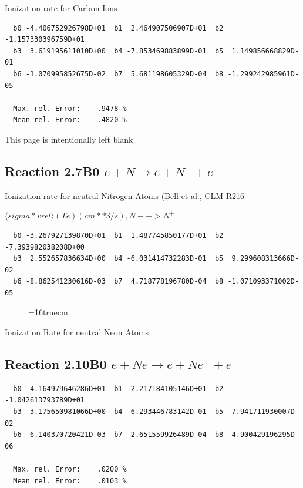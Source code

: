 \documentclass[12pt,dvips]{article}
\begin{document}
  Ionization rate for Carbon Ions


\begin{small}\begin{verbatim}
  b0 -4.406752926798D+01  b1  2.464907506907D+01  b2 -1.157330396759D+01
  b3  3.619195611010D+00  b4 -7.853469883899D-01  b5  1.149856668829D-01
  b6 -1.070995852675D-02  b7  5.681198605329D-04  b8 -1.299242985961D-05

  Max. rel. Error:    .9478 %
  Mean rel. Error:    .4820 %

\end{verbatim}\end{small}
\newpage
This page is intentionally left blank
\newpage



\subsection{
Reaction 2.7B0   $e + N \rightarrow e + N^+ + e  $
}

  Ionization rate for neutral Nitrogen Atoms
  (Bell et al., CLM-R216

  $ \langle sigma*vrel \rangle(Te)  (cm**3/s), N --> N^+$

\begin{small}\begin{verbatim}
  b0 -3.267927139870D+01  b1  1.487745850177D+01  b2 -7.393982038208D+00
  b3  2.552657836634D+00  b4 -6.031414732283D-01  b5  9.299608313666D-02
  b6 -8.862541230616D-03  b7  4.718778196780D-04  b8 -1.071093371002D-05

\end{verbatim}\end{small}
\begin{figure} \label{2.7B0}
\epsfxsize=16truecm
\end{figure}
\newpage


 Ionization Rate for neutral Neon Atoms

\subsection{
Reaction 2.10B0   $e + Ne \rightarrow e + Ne^+ + e  $
}

\begin{small}\begin{verbatim}
  b0 -4.164979646286D+01  b1  2.217184105146D+01  b2 -1.042613793789D+01
  b3  3.175650981066D+00  b4 -6.293446783142D-01  b5  7.941711930007D-02
  b6 -6.140370720421D-03  b7  2.651559926489D-04  b8 -4.900429196295D-06

  Max. rel. Error:    .0200 %
  Mean rel. Error:    .0103 %

\end{verbatim}\end{small}
\end{document}
